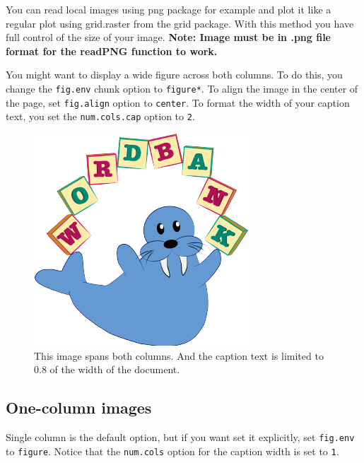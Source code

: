 \documentclass[10pt, letterpaper]{article}
\newenvironment{CodeChunk}{}{}
\begin{document}
You can read local images using png package for example and plot it like
a regular plot using grid.raster from the grid package. With this method
you have full control of the size of your image. \textbf{Note: Image
must be in .png file format for the readPNG function to work.}

You might want to display a wide figure across both columns. To do this,
you change the \texttt{fig.env} chunk option to \texttt{figure*}. To
align the image in the center of the page, set \texttt{fig.align} option
to \texttt{center}. To format the width of your caption text, you set
the \texttt{num.cols.cap} option to \texttt{2}.

\begin{CodeChunk}
\captionsetup{width=0.8\textwidth}\begin{figure}[h]

{\centering \includegraphics{figs/2-col-image-1} 

}

\caption[This image spans both columns]{This image spans both columns. And the caption text is limited to 0.8 of the width of the document.}\label{fig:2-col-image}
\end{figure}
\end{CodeChunk}

\subsection{One-column images}\label{one-column-images}

Single column is the default option, but if you want set it explicitly,
set \texttt{fig.env} to \texttt{figure}. Notice that the
\texttt{num.cols} option for the caption width is set to \texttt{1}.
\end{document}
